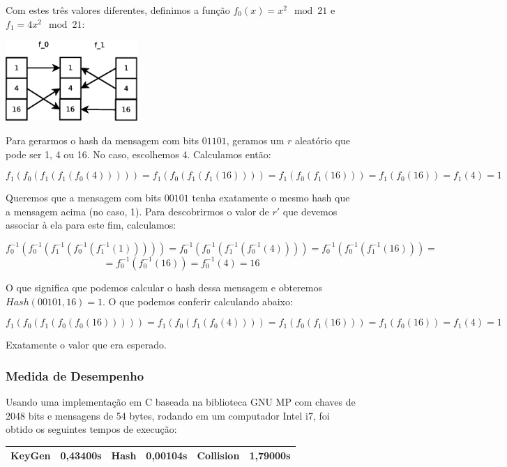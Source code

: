 \documentclass[a4paper]{article}
\begin{document}
    Com estes três valores diferentes, definimos a função $f_0(x)=x^2\mod
    21$ e $f_1=4x^2\mod 21$:
    
    \includegraphics[width=5cm]{imagens/toy1.eps}
    
    Para gerarmos o hash da mensagem com bits $01101$, geramos um $r$
    aleatório que pode ser 1, 4 ou 16. No caso, escolhemos 4. Calculamos
    então:
    
    $$
    f_1(f_0(f_1(f_1(f_0(4))))) = f_1(f_0(f_1(f_1(16)))) = f_1(f_0(f_1(16))) =
    f_1(f_0(16)) = f_1(4) = 1
    $$
    
    Queremos que a mensagem com bits $00101$ tenha exatamente o mesmo hash
    que a mensagem acima (no caso, 1). Para descobrirmos o valor de $r'$
    que devemos associar à ela para este fim, calculamos:
    
    $$
    f_0^{-1}(f_0^{-1}(f_1^{-1}(f_0^{-1}(f_1^{-1}(1))))) =
    f_0^{-1}(f_0^{-1}(f_1^{-1}(f_0^{-1}(4)))) =
    f_0^{-1}(f_0^{-1}(f_1^{-1}(16))) =
    $$
    $$
    =f_0^{-1}(f_0^{-1}(16)) = f_0^{-1}(4) = 16
    $$
    
    O que significa que podemos calcular o hash dessa mensagem e obteremos
    $Hash(00101, 16)=1$. O que podemos conferir calculando abaixo:
    
    $$
    f_1(f_0(f_1(f_0(f_0(16))))) = f_1(f_0(f_1(f_0(4)))) = f_1(f_0(f_1(16))) =
    f_1(f_0(16)) = f_1(4) = 1
    $$
    
    Exatamente o valor que era esperado.
    
    \subsubsection{Medida de Desempenho}
    
    Usando uma implementação em C baseada na biblioteca GNU MP com chaves
    de 2048 bits e mensagens de 54 bytes, rodando em um computador Intel
    i7, foi obtido os seguintes tempos de execução:
    
    \begin{center}
    \begin{tabular}{|c|c|c|c|c|c|}
      \hline
      KeyGen & 0,43400s & Hash & 0,00104s & Collision & 1,79000s\\
      \hline
    \end{tabular}
    \end{center}
    
\end{document}
